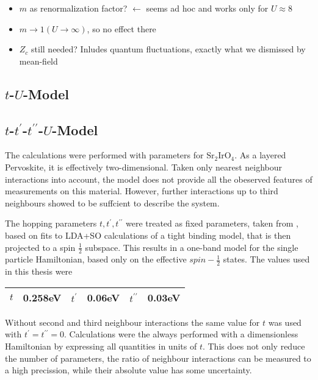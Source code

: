 \documentclass[a4paper,10pt]{report}
\begin{document}
\begin{itemize}
 \item $m$ as renormalization factor? $\leftarrow$ seems ad hoc and works only for $U\approx 8$
 \item $m\rightarrow 1 (U\rightarrow\infty)$, so no effect there
 \item $Z_c$ still needed? Inludes quantum fluctuations, exactly what we dismissed by mean-field
\end{itemize}



\subsection{$t$-$U$-Model}

\subsection{$t$-$t^{\prime}$-$t^{\prime \prime}$-$U$-Model}

The calculations were performed with parameters for $\mathrm{Sr}_2 \mathrm{Ir} \mathrm{O}_4$.
As a layered Pervoskite, it is effectively two-dimensional.
Taken only nearest neighbour interactions into account, the model does not provide all the obeserved features of measurements on this material.
However, further interactions up to third neighbours showed to be suffcient to describe the system. 

The hopping parameters $t,t^{\prime},t^{\prime \prime}$ were treated as fixed parameters, taken from 
\cite{PhysRevLett.106.136402}, based on fits to LDA+SO calculations of a tight binding model, that is then projected to a spin $\frac12$ subspace. 
This results in a one-band model for the single particle Hamiltonian, based only on the effective $spin-\frac12$ states.
The values used in this thesis were 

\begin{center}{
\begin{tabular}{|r@{=}l|r@{=}l|r@{=}l|}
\hline
$t$ & 0.258eV &
$t^{\prime}$ & 0.06eV &
$t^{\prime \prime}$ & 0.03eV \\
\hline
\end{tabular}
}\end{center} 
Without second and third neighbour interactions the same value for $t$ was used with $t^{\prime} = t^{\prime \prime} = 0$. 
Calculations were the always performed with a dimensionless Hamiltonian by expressing all quantities in units of $t$.
This does not only reduce the number of parameters, the ratio of neighbour interactions can be measured to a high precission, while 
their absolute value has some uncertainty.
\end{document}
